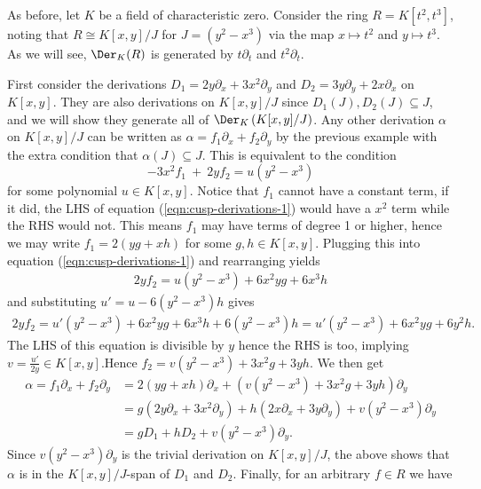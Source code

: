 \begin{example}\label{example:cusp-derivations}
	As before, let $K$ be a field of characteristic zero. Consider the ring $R = K[t^2,t^3]$, noting that $R \cong K[x,y]/J$ for $J = (y^2 - x^3)$ via the map $x\mapsto t^2$ and $y\mapsto t^3$. As we will see, $\Der_K(R)$ is generated by $t\partial_t$ and $t^2\partial_t$.

	First consider the derivations $D_1 = 2y\partial_x + 3x^2\partial_y$ and $D_2 = 3y\partial_y + 2x\partial_x$ on $K[x,y]$. They are also derivations on $K[x,y]/J$ since $D_1(J), D_2(J) \subseteq J$, and we will show they generate all of $\Der_K \left(K[x,y]/J\right)$. Any other derivation $\alpha$ on $K[x,y]/J$ can be written as $\alpha = f_1\partial_x + f_2\partial_y$ by the previous example with the extra condition that $\alpha(J)\subseteq J$. This is equivalent to the condition
	\begin{equation}\label{eqn:cusp-derivations-1}
		-3x^2f_1 ~+~ 2yf_2 = u(y^2 - x^3)
	\end{equation}
	for some polynomial $u \in K[x,y]$. Notice that $f_1$ cannot have a constant term, if it did, the LHS of equation (\ref{eqn:cusp-derivations-1}) would have a $x^2$ term while the RHS would not. This means $f_1$ may have terms of degree 1 or higher, hence we may write $f_1 = 2(yg + xh)$ for some $g, h \in K[x,y]$. Plugging this into equation (\ref{eqn:cusp-derivations-1}) and rearranging yields
	\begin{align*}
		2yf_2 = u(y^2 - x^3) + 6x^2yg + 6x^3h
	\end{align*}
	and substituting $u' = u - 6(y^2 - x^3)h$ gives
	\begin{align*}
		2yf_2 = u'(y^2 - x^3) + 6x^2yg + 6x^3h + 6(y^2 - x^3)h = u'(y^2 - x^3) + 6x^2yg + 6y^2h.
	\end{align*}
	The LHS of this equation is divisible by $y$ hence the RHS is too, implying $v = \frac{u'}{2y} \in K[x,y]$.Hence $f_2 = v(y^2 - x^3) + 3x^2g + 3yh$. We then get
	\begin{align*}
		\alpha = f_1\partial_x + f_2\partial_y 
		  &= 2(yg + xh)\partial_x + \left(v(y^2 - x^3) + 3x^2g + 3yh\right) \partial_y \\
		  &= g(2y\partial_x + 3x^2\partial_y) + h(2x\partial_x + 3y\partial_y) + v(y^2-x^3)\partial_y \\
		  &= gD_1 + hD_2 + v(y^2 - x^3)\partial_y.
	\end{align*}
	Since $v(y^2-x^3)\partial_y$ is the trivial derivation on $K[x,y]/J$, the above shows that $\alpha$ is in the $K[x,y]/J$-span of $D_1$ and $D_2$. Finally, for an arbitrary $f \in R$ we have

\end{example}
